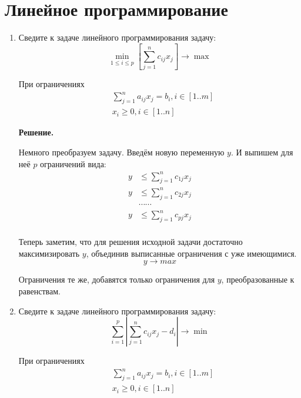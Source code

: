 \section{Линейное программирование}
\begin{enumerate}
	\item Сведите к задаче линейного программирования задачу:
	\begin{equation*}
		\min\limits_{1 \leqslant i \leqslant p} \left[ \sum\limits_{j = 1}^n c_{ij} x_j \right] \to \max
	\end{equation*}
	
	При ограничениях 
	\begin{align*}
		& \sum\limits_{j = 1}^n a_{ij} x_j = b_i, i \in [1..m] \\
		& x_i \geqslant 0, i \in [1..n]
	\end{align*}
	
	\textbf{Решение.}
	
	Немного преобразуем задачу. Введём новую переменную $y$. И выпишем для неё $p$ ограничений вида:
	\begin{align*}
		y &\leqslant \sum\limits_{j = 1}^nc_{1j}x_j \\
		y &\leqslant \sum\limits_{j = 1}^nc_{2j}x_j \\
		&\cdots\cdots \\
		y &\leqslant \sum\limits_{j = 1}^nc_{pj}x_j \\
	\end{align*}
	
	Теперь заметим, что для решения исходной задачи достаточно максимизировать $y$, объединив выписанные 
	ограничения с уже имеющимися.
	\begin{equation*}
		y \to max
	\end{equation*}
	
	Ограничения те же, добавятся только ограничения для $y$, преобразованные к равенствам.
		
	\item Сведите к задаче линейного программирования задачу:
	\begin{equation*}
	\sum\limits_{i = 1}^p \left|\sum\limits_{j = 1}^n c_{ij}x_j - d_i\right| \to \min
	\end{equation*}
	
	При ограничениях 
	\begin{align*}
	& \sum\limits_{j = 1}^n a_{ij} x_j = b_i, i \in [1..m] \\
	& x_i \geqslant 0, i \in [1..n]
	\end{align*}
	

\end{enumerate}
